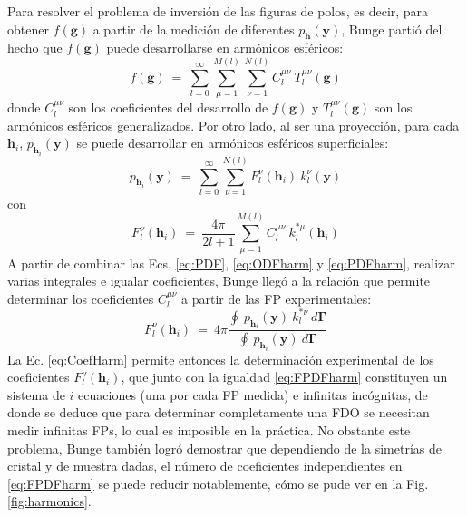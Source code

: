 Para resolver el problema de inversión de las figuras de polos, es decir, para obtener $f(\mathbf{g})$ a partir de la medición de diferentes $p_{\mathbf{h}}(\mathbf{y})$, Bunge partió del hecho que $f(\mathbf{g})$ puede desarrollarse en armónicos esféricos:
\begin{equation}
  f(\mathbf{g}) \ = \ \sum_{l=0}^{\infty} \sum_{\mu=1}^{M(l)} \sum_{\nu=1}^{N(l)} C_{l}^{\mu \nu} \ T_{l}^{\mu \nu}(\mathbf{g})
  \label{eq:ODFharm}
\end{equation}
\noindent
donde $C_{l}^{\mu \nu}$ son los coeficientes del desarrollo de $f(\mathbf{g})$ y $T_{l}^{\mu \nu}(\mathbf{g})$ son los armónicos esféricos generalizados.
Por otro lado, al ser una proyección, para cada $\mathbf{h}_i$, $p_{\mathbf{h}_i}(\mathbf{y})$ se puede desarrollar en armónicos esféricos superficiales:
\begin{equation}
  p_{\mathbf{h}_i}(\mathbf{y}) \ = \ \sum_{l=0}^{\infty} \sum_{\nu=1}^{N(l)} F_{l}^{\nu}(\mathbf{h}_i) \ k_{l}^{\nu}(\mathbf{y})
  \label{eq:PDFharm}
\end{equation}
\noindent
con
\begin{equation}
  F_{l}^{\nu}(\mathbf{h}_i) \ = \ \frac{4 \pi}{2l + 1} \sum_{\mu=1}^{M(l)} C_{l}^{\mu \nu} \ k_{l}^{* \mu}(\mathbf{h}_i)
  \label{eq:FPDFharm}
\end{equation}
\noindent
A partir de combinar las Ecs. \ref{eq:PDF}, \ref{eq:ODFharm} y \ref{eq:PDFharm}, realizar varias integrales e igualar coeficientes, Bunge llegó a la relación que permite determinar los coeficientes $C_{l}^{\mu \nu}$ a partir de las FP experimentales\cite{bunge2013texture}:
\begin{equation}
  F_{l}^{\nu}(\mathbf{h}_i) \ = \ 4 \pi \frac{\oint \ p_{\mathbf{h}_i}(\mathbf{y}) \ k_{l}^{* \nu} \ d\mathbf{\Gamma}}{\oint \ p_{\mathbf{h}_i}(\mathbf{y}) \ d\mathbf{\Gamma}}
  \label{eq:CoefHarm}
\end{equation}
\noindent
La Ec. \ref{eq:CoefHarm} permite entonces la determinación experimental de los coeficientes $F_{l}^{\nu}(\mathbf{h}_i)$, que junto con la igualdad \ref{eq:FPDFharm} constituyen un sistema de $i$ ecuaciones (una por cada FP medida) e infinitas incógnitas, de donde se deduce que para determinar completamente una FDO se necesitan medir infinitas FPs, lo cual es imposible en la práctica.
No obstante este problema, Bunge\cite{bunge2013texture} también logró demostrar que dependiendo de la simetrías de cristal y de muestra dadas, el número de coeficientes independientes en \ref{eq:FPDFharm} se puede reducir notablemente, cómo se pude ver en la Fig. \ref{fig:harmonics}.
